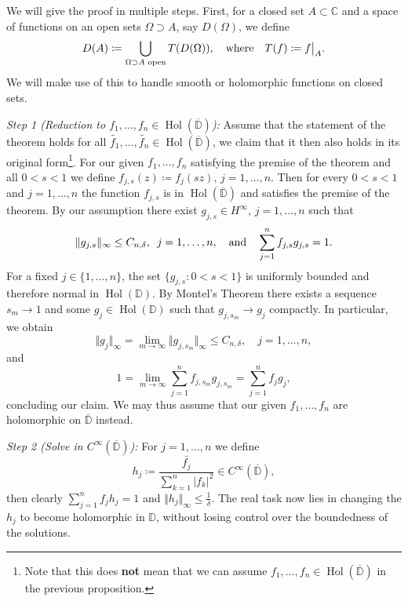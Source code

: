 \documentclass[letterpaper, 11pt]{article}
\newcommand{\C}{\mathbb{C}}
\newcommand{\D}{\mathbb{D}}
\newcommand{\1}{\mathds{1}}
\newcommand{\cl}[1]{\overline{#1}}
\newcommand{\restr}[2]{{%
  \left.\kern-\nulldelimiterspace %
  #1 %
  \littletaller %
  \right|_{#2} %
  }}
\newcommand{\littletaller}{\mathchoice{\vphantom{\big|}}{}{}{}}
\DeclareMathOperator*{\Hol}{Hol}
\theoremstyle{definition}
\newenvironment{innerproof}
 {\renewcommand{\qedsymbol}{}\proof}
 {\endproof}
\begin{document}
\begin{innerproof}
  We will give the proof in multiple steps. First, for a closed set $A \subset \C$ and a space of functions on an open sets $\Omega \supset A$, say $D(\Omega)$, we define
  \begin{equation*}
    D(A) \coloneqq \bigcup_{\Omega \supset A \textrm{ open}} T(D(\Omega)), \quad \textrm{where} \quad T(f) \coloneqq \restr{f}{A}.
  \end{equation*}
  We will make use of this to handle smooth or holomorphic functions on closed sets.

  \textit{Step 1 (Reduction to $f_1, \dots, f_n \in \Hol(\cl{\D})$):} Assume that the statement of the theorem holds for all $\widetilde{f_1}, \dots, \widetilde{f_n} \in \Hol(\cl{\D})$, we claim that it then also holds in its original form\footnote{Note that this does \textbf{not} mean that we can assume $f_1, \dots, f_n \in \Hol(\cl{\D})$ in the previous proposition.}. For our given $f_1, \dots, f_n$ satisfying the premise of the theorem and all $0 < s < 1$ we define $ f_{j,s}(z) \coloneqq f_{j}(sz), \, j=1,\dots,n $. Then for every $0 < s < 1$ and $j = 1, \dots, n$ the function $f_{j,s}$ is in $\Hol(\cl{\D})$ and satisfies the premise of the theorem. By our assumption there exist $g_{j,s} \in H^\infty, \, j=1,\dots,n$ such that
  $$ \Vert g_{j,s} \Vert_\infty \leq C_{n,\delta}, \hspace{0.5em} j = 1, \dots, n, \quad \textrm{and} \quad \sum_{j=1}^n f_{j,s} g_{j,s} = 1. $$
  For a fixed $j \in \{ 1, \dots, n \}$, the set $\{ g_{j,s} : 0 < s < 1 \}$ is uniformly bounded and therefore normal in $\Hol(\D)$. By Montel's Theorem there exists a sequence $s_m \to 1$ and some $g_j \in \Hol(\D)$ such that $g_{j,s_m} \to g_{j}$ compactly. In particular, we obtain
  $$ \Vert g_j \Vert_\infty = \lim_{m \to \infty} \Vert g_{j,s_m} \Vert_\infty \leq C_{n,\delta}, \quad j=1,\dots,n, $$
  and
  $$ 1 = \lim_{m \to \infty} \sum_{j=1}^n f_{j,s_m} g_{j,s_m} = \sum_{j=1}^n f_j g_j, $$
  concluding our claim. We may thus assume that our given $f_1, \dots, f_n$ are holomorphic on $\cl{\D}$ instead.

  \textit{Step 2 (Solve in $C^\infty(\cl{\D})$):} For $j=1,\dots,n$ we define
  $$ h_j \coloneqq \frac{\bar{f_j}}{\sum_{k=1}^n \vert f_k \vert^2} \in C^\infty(\cl{\D}), $$
  then clearly $ \sum_{j=1}^n f_j h_j = 1$ and $\Vert h_j \Vert_\infty \leq \frac{1}{\delta}$. The real task now lies in changing the $h_j$ to become holomorphic in $\D$, without losing control over the boundedness of the solutions.
\end{innerproof}
\end{document}
